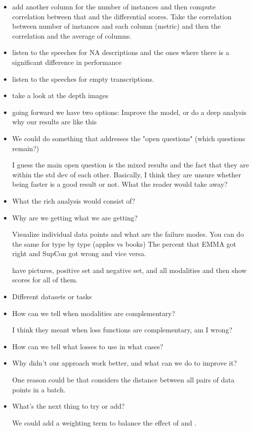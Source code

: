 \begin{itemize}
    \item \OK add another column for the number of instances and then compute correlation between that and the differential scores. Take the correlation between number of instances and each column (metric) and then the correlation and the average of columns.

    \item listen to the speeches for NA descriptions and the ones where there is a significant difference in performance

    \item \OK listen to the speeches for empty transcriptions.

    \item \TD take a look at the depth images
    
    \item going forward we have two options: Improve the model, or do a deep analysis why our results are like this
    
    \item We could do something that addresses the "open questions" (which questions remain?)

    I guess the main open question is the mixed results and the fact that they are within the std dev of each other. Basically, I think they are unsure whether being faster is a good result or not.
    What the reader would take away?
    
    \item \DO What the rich analysis would consist of?

    \item Why are we getting what we are getting?
    
    Visualize individual data points and what are the failure modes.
    You can do the same for type by type (apples vs books)
    The percent that EMMA got right and SupCon got wrong and vice versa.

    have pictures, positive set and negative set,
    and all modalities and then show scores for all of them.
    
    \item \TD Different datasets or tasks
    \item \TD How can we tell when modalities are complementary?

    I think they meant when loss functions are complementary, am I wrong?
    
    \item \TD How can we tell what losses to use in what cases?
    
    \item  \TD Why didn't our approach work better, and what can we do to improve it?
    
    One reason could be that \supcon{} considers the distance between all pairs of data points in a batch.
    
    \item What's the next thing to try or add?
    
    We could add a weighting term to balance the effect of \supcon{} and \geom{}.
    
\end{itemize}


